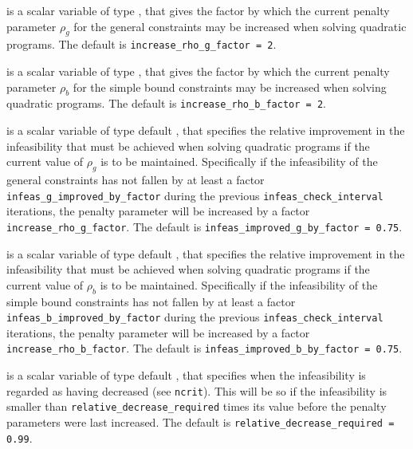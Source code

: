 \begin{description}
 is a scalar variable of type \realdp,
that gives the factor by which the current penalty parameter $\rho_g$
for the general constraints may be increased when solving quadratic programs.
The default is {\tt increase\_rho\_g\_factor = 2}.

 is a scalar variable of type \realdp,
that gives the factor by which the current penalty parameter $\rho_b$ for
the simple bound constraints may be increased when solving quadratic programs.
The default is {\tt increase\_rho\_b\_factor = 2}.

 is a scalar variable of type default
\realdp, that specifies the relative improvement in the infeasibility
that must be achieved when solving quadratic programs if the current
value of $\rho_g$ is to be maintained.
Specifically if the infeasibility of the general constraints
has not fallen by at least a factor {\tt infeas\_g\_improved\_by\_factor}
during the previous {\tt infeas\_check\_interval} iterations, the
penalty parameter will be increased by a factor
{\tt increase\_rho\_g\_factor}.
The default is {\tt infeas\_im\-proved\_g\_by\_factor = 0.75}.

 is a scalar variable of type default
\realdp, that specifies the relative improvement in the infeasibility
that must be achieved when solving quadratic programs if the current
value of $\rho_b$ is to be maintained.
Specifically if the infeasibility of the simple bound constraints
has not fallen by at least a factor {\tt infeas\_b\_improved\_by\_factor}
during the previous {\tt infeas\_check\_in\-terval} iterations, the
penalty parameter will be increased by a factor
{\tt increase\_rho\_b\_factor}.
The default is {\tt infeas\_im\-proved\_b\_by\_factor = 0.75}.

 is a scalar variable of type default
\realdp, that specifies when the infeasibility is regarded as having
decreased (see {\tt ncrit}). This will be so if the infeasibility is
smaller than {\tt relative\_decrease\_required} times its value
before the penalty parameters were last increased.
The default is {\tt relative\_decrease\_required = 0.99}.



\end{description}

